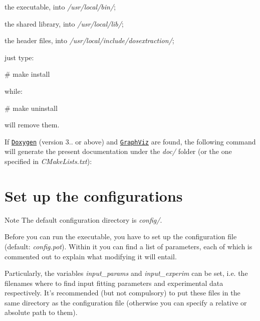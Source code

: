\begin{DoxyItemize}
\item the executable, into {\itshape /usr/local/bin/}; \item the shared library, into {\itshape /usr/local/lib/}; \item the header files, into {\itshape /usr/local/include/dosextraction/};\end{DoxyItemize}
just type\-:


\begin{DoxyCode}
\textcolor{preprocessor}{# make install}
\end{DoxyCode}


while\-:


\begin{DoxyCode}
\textcolor{preprocessor}{# make uninstall}
\end{DoxyCode}


will remove them. \par
 If \href{http://www.doxygen.org}{\tt Doxygen} (version 3.. or above) and \href{http://www.graphviz.org}{\tt Graph\-Viz} are found, the following command will generate the present documentation under the {\itshape doc/} folder (or the one specified in {\itshape C\-Make\-Lists.\-txt})\-:


\hypertarget{index_configure}{}\section{Set up the configurations}\label{index_configure}
\begin{DoxyNote}{Note}
The default configuration directory is {\itshape config/}.
\end{DoxyNote}
Before you can run the executable, you have to set up the configuration file (default\-: {\itshape config.\-pot}). Within it you can find a list of parameters, each of which is commented out to explain what modifying it will entail. \par
Particularly, the variables {\itshape input\-\_\-params} and {\itshape input\-\_\-experim} can be set, i.\-e. the filenames where to find input fitting parameters and experimental data respectively. It's recommended (but not compulsory) to put these files in the same directory as the configuration file (otherwise you can specify a relative or absolute path to them).

